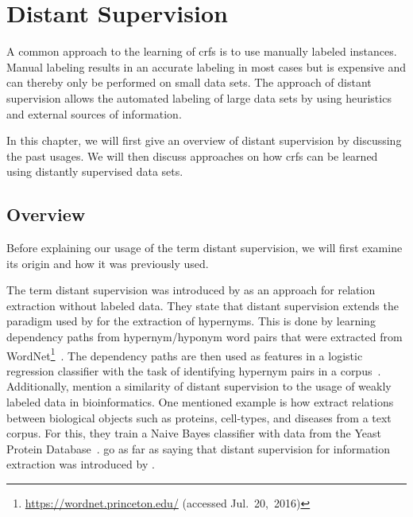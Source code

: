 \chapter{Distant Supervision}\label{cha:distant-supervision}

A common approach to the learning of \glspl{crf} is to use manually labeled instances.
Manual labeling results in an accurate labeling in most cases but is expensive and can thereby only be performed on small data sets.
The approach of \gls{distant supervision} allows the automated labeling of large data sets by using heuristics and external sources of information.

In this chapter, we will first give an overview of \gls{distant supervision} by discussing the past usages.
We will then discuss approaches on how \glspl{crf} can be learned using distantly supervised data sets.

\section{Overview}

Before explaining our usage of the term \gls{distant supervision}, we will first examine its origin and how it was previously used.

\bigskip

The term \gls{distant supervision} was introduced by \citet{mintz2009distant} as an approach for relation extraction without labeled data.
They state that \gls{distant supervision} extends the paradigm used by \citet{snow2005learning} for the extraction of hypernyms.
This is done by learning dependency paths from hypernym/hyponym word pairs that were extracted from WordNet\footnote{\url{https://wordnet.princeton.edu/} (accessed Jul.~20,~2016)}~\citep{snow2005learning}.
The dependency paths are then used as features in a logistic regression classifier with the task of identifying hypernym pairs in a corpus~\citep{snow2005learning}.
Additionally, \citet{mintz2009distant} mention a similarity of \gls{distant supervision} to the usage of weakly labeled data in bioinformatics.
One mentioned example is how \citet{craven1999constructing} extract relations between biological objects such as proteins, cell-types, and diseases from a text corpus.
For this, they train a Naive Bayes classifier with data from the Yeast Protein Database~\citep{payne1997yeast}.
\citet{surdeanu2012multi} go as far as saying that distant supervision for information extraction was introduced by \citet{craven1999constructing}.

